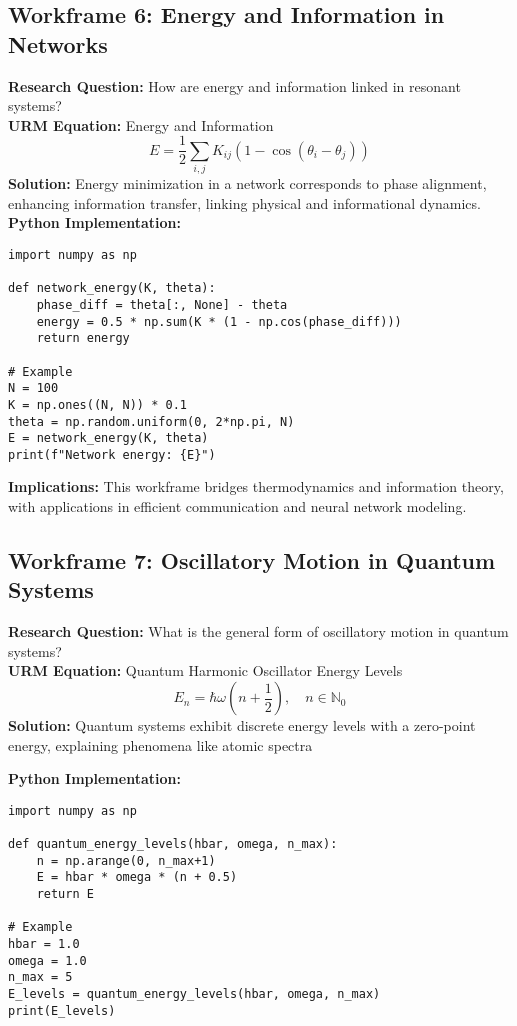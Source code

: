 \documentclass[12pt]{article}
\begin{document}
\clearpage

\subsection{Workframe 6: Energy and Information in Networks}
\textbf{Research Question:} How are energy and information linked in resonant systems? \\
\textbf{URM Equation:} Energy and Information
\[
E = \frac{1}{2} \sum_{i,j} K_{ij} (1 - \cos(\theta_i - \theta_j))
\]
\textbf{Solution:} Energy minimization in a network corresponds to phase alignment, enhancing information transfer, linking physical and informational dynamics. \\
\textbf{Python Implementation:}
\begin{lstlisting}[caption={Network Energy Calculation}]
import numpy as np

def network_energy(K, theta):
    phase_diff = theta[:, None] - theta
    energy = 0.5 * np.sum(K * (1 - np.cos(phase_diff)))
    return energy

# Example
N = 100
K = np.ones((N, N)) * 0.1
theta = np.random.uniform(0, 2*np.pi, N)
E = network_energy(K, theta)
print(f"Network energy: {E}")
\end{lstlisting}
\textbf{Implications:} This workframe bridges thermodynamics and information theory, with applications in efficient communication and neural network modeling.

\clearpage

\subsection{Workframe 7: Oscillatory Motion in Quantum Systems}
\textbf{Research Question:} What is the general form of oscillatory motion in quantum systems? \\
\textbf{URM Equation:} Quantum Harmonic Oscillator Energy Levels
\[
E_n = \hbar \omega \left(n + \frac{1}{2}\right), \quad n \in \mathbb{N}_0
\]
\textbf{Solution:} Quantum systems exhibit discrete energy levels with a zero-point energy, explaining phenomena like atomic spectra 

\textbf{Python Implementation:}
\begin{lstlisting}[caption={Quantum Energy Levels Calculation}]
import numpy as np

def quantum_energy_levels(hbar, omega, n_max):
    n = np.arange(0, n_max+1)
    E = hbar * omega * (n + 0.5)
    return E

# Example
hbar = 1.0
omega = 1.0
n_max = 5
E_levels = quantum_energy_levels(hbar, omega, n_max)
print(E_levels)
\end{lstlisting}
\end{document}
